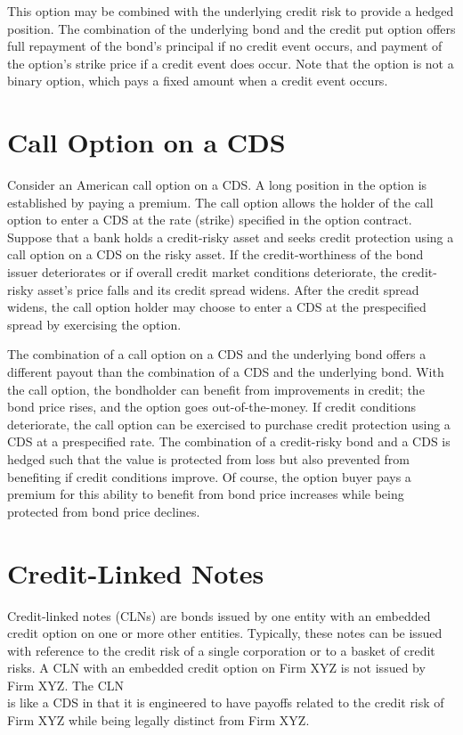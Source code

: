 \documentclass[11pt]{article}
\begin{document}
This option may be combined with the underlying credit risk to provide a hedged position. The combination of the underlying bond and the credit put option offers full repayment of the bond's principal if no credit event occurs, and payment of the option's strike price if a credit event does occur. Note that the option is not a binary option, which pays a fixed amount when a credit event occurs.

\section*{Call Option on a CDS}
Consider an American call option on a CDS. A long position in the option is established by paying a premium. The call option allows the holder of the call option to enter a CDS at the rate (strike) specified in the option contract. Suppose that a bank holds a credit-risky asset and seeks credit protection using a call option on a CDS on the risky asset. If the credit-worthiness of the bond issuer deteriorates or if overall credit market conditions deteriorate, the credit-risky asset's price falls and its credit spread widens. After the credit spread widens, the call option holder may choose to enter a CDS at the prespecified spread by exercising the option.

The combination of a call option on a CDS and the underlying bond offers a different payout than the combination of a CDS and the underlying bond. With the call option, the bondholder can benefit from improvements in credit; the bond price rises, and the option goes out-of-the-money. If credit conditions deteriorate, the call option can be exercised to purchase credit protection using a CDS at a prespecified rate. The combination of a credit-risky bond and a CDS is hedged such that the value is protected from loss but also prevented from benefiting if credit conditions improve. Of course, the option buyer pays a premium for this ability to benefit from bond price increases while being protected from bond price declines.

\section*{Credit-Linked Notes}
Credit-linked notes (CLNs) are bonds issued by one entity with an embedded credit option on one or more other entities. Typically, these notes can be issued with reference to the credit risk of a single corporation or to a basket of credit risks. A CLN with an embedded credit option on Firm XYZ is not issued by Firm XYZ. The CLN\\
is like a CDS in that it is engineered to have payoffs related to the credit risk of Firm XYZ while being legally distinct from Firm XYZ.
\end{document}

